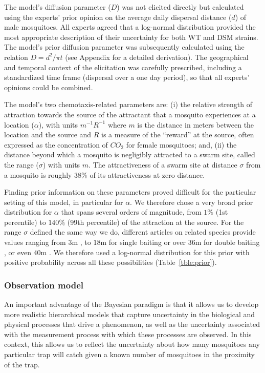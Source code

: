 \documentclass[]{bmcart}
\newcommand{\va}{{\alpha}}
\newcommand{\vd}{{D}}
\begin{document}
The model's diffusion parameter ($\vd$) was not elicited directly but calculated using the experts' prior opinion on the average daily dispersal distance ($d$) of male mosquitoes. All experts agreed that a log-normal distribution provided the most appropriate description of their uncertainty for both WT and DSM strains. The model's prior diffusion parameter was subsequently calculated using the relation $\vd = d^2/\pi t$ (see Appendix for a detailed derivation). The geographical and temporal context of the elicitation was carefully prescribed, including a standardized time frame (dispersal over a one day period), so that all experts' opinions could be combined.

The model's two chemotaxis-related parameters are: (i) the relative strength of attraction towards the source of the attractant that a mosquito experiences at a location ($\va$), with units $m^{-1} R^{-1}$ where $m$ is the distance in meters between the location and the source and $R$ is a measure of the ``reward'' at the source, often expressed as the concentration of $CO_2$ for female mosquitoes; and, (ii) the distance beyond which a mosquito is negligibly attracted to a swarm site, called the range ($\sigma$) with units $m$. The attractiveness of a swarm site at distance $\sigma$ from a mosquito is roughly 38\% of its attractiveness at zero distance.

Finding prior information on these parameters proved difficult for the particular setting of this model, in particular for $\va$. We therefore chose a very broad prior distribution for $\va$ that spans several orders of magnitude, from $1\%$ (1st percentile) to $140\%$ (99th percentile) of the attraction at the source. For the range $\sigma$ defined the same way we do, different articles on related species provide values ranging from $3$m \cite{McIver1989}, to $18$m for single baiting or over $36$m for double baiting \cite{Gillies1972}, or even $40$m \cite{Zhu2015}. We therefore used a log-normal distribution for this prior with positive probability across all these possibilities (Table~\ref{tble:prior}). 

\subsubsection{Observation model}
An important advantage of the Bayesian paradigm is that it allows us to develop more realistic hierarchical models that capture uncertainty in the biological and physical processes that drive a phenomenon, as well as the uncertainty associated with the measurement process with which these processes are observed. In this context, this allows us to reflect the uncertainty about how many mosquitoes any particular trap will catch given a known number of mosquitoes in the proximity of the trap.
\end{document}
